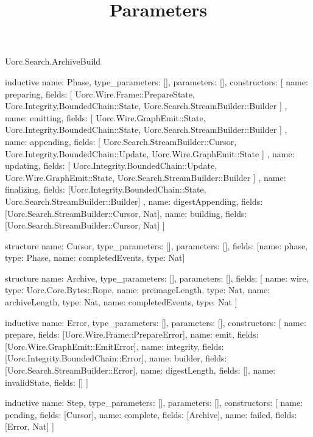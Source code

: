 \begin{lexlean}{Uorc.Search.ArchiveBuild}
\title{Parameters}
\begin{semanticmodule}
inductive{
  name: Phase,
  type_parameters: [],
  parameters: [],
  constructors: [
    {
      name: preparing,
      fields: [
        Uorc.Wire.Frame::PrepareState,
        Uorc.Integrity.BoundedChain::State,
        Uorc.Search.StreamBuilder::Builder
      ]
    },
    {
      name: emitting,
      fields: [
        Uorc.Wire.GraphEmit::State,
        Uorc.Integrity.BoundedChain::State,
        Uorc.Search.StreamBuilder::Builder
      ]
    },
    {
      name: appending,
      fields: [
        Uorc.Search.StreamBuilder::Cursor,
        Uorc.Integrity.BoundedChain::Update,
        Uorc.Wire.GraphEmit::State
      ]
    },
    {
      name: updating,
      fields: [
        Uorc.Integrity.BoundedChain::Update,
        Uorc.Wire.GraphEmit::State,
        Uorc.Search.StreamBuilder::Builder
      ]
    },
    {
      name: finalizing,
      fields: [Uorc.Integrity.BoundedChain::State, Uorc.Search.StreamBuilder::Builder]
    },
    {name: digestAppending, fields: [Uorc.Search.StreamBuilder::Cursor, Nat]},
    {name: building, fields: [Uorc.Search.StreamBuilder::Cursor, Nat]}
  ]
}

structure{
  name: Cursor,
  type_parameters: [],
  parameters: [],
  fields: [{name: phase, type: Phase}, {name: completedEvents, type: Nat}]
}

structure{
  name: Archive,
  type_parameters: [],
  parameters: [],
  fields: [
    {name: wire, type: Uorc.Core.Bytes::Rope},
    {name: preimageLength, type: Nat},
    {name: archiveLength, type: Nat},
    {name: completedEvents, type: Nat}
  ]
}

inductive{
  name: Error,
  type_parameters: [],
  parameters: [],
  constructors: [
    {name: prepare, fields: [Uorc.Wire.Frame::PrepareError]},
    {name: emit, fields: [Uorc.Wire.GraphEmit::EmitError]},
    {name: integrity, fields: [Uorc.Integrity.BoundedChain::Error]},
    {name: builder, fields: [Uorc.Search.StreamBuilder::Error]},
    {name: digestLength, fields: []},
    {name: invalidState, fields: []}
  ]
}

inductive{
  name: Step,
  type_parameters: [],
  parameters: [],
  constructors: [
    {name: pending, fields: [Cursor]},
    {name: complete, fields: [Archive]},
    {name: failed, fields: [Error, Nat]}
  ]
}


\end{semanticmodule}
\end{lexlean}
